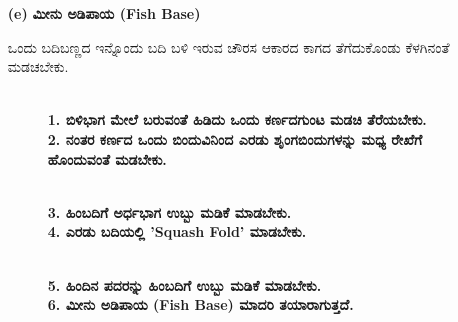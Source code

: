 \begin{enumerate}
\item[{\bf (e)}] \textbf{ಮೀನು ಅಡಿಪಾಯ (Fish Base)}

ಒಂದು ಬದಿಬಣ್ಣದ ಇನ್ನೊಂದು ಬದಿ ಬಳಿ ಇರುವ ಚೌರಸ ಆಕಾರದ ಕಾಗದ ತೆಗೆದುಕೊಂಡು ಕೆಳಗಿನಂತೆ ಮಡಚಬೇಕು.
\begin{figure}[H]
\\
\textbf{1. ಬಿಳಿಭಾಗ ಮೇಲೆ ಬರುವಂತೆ ಹಿಡಿದು ಒಂದು ಕರ್ಣದಗುಂಟ ಮಡಚಿ ತೆರೆಯಬೇಕು.}\\
\textbf{2. ನಂತರ ಕರ್ಣದ ಒಂದು ಬಿಂದುವಿನಿಂದ ಎರಡು ಶೃಂಗಬಿಂದುಗಳನ್ನು ಮಧ್ಯ ರೇಖೆಗೆ ಹೊಂದುವಂತೆ ಮಡಬೇಕು.}
\end{figure}
\begin{figure}[H]
\\
\textbf{3. ಹಿಂಬದಿಗೆ ಅರ್ಧಭಾಗ ಉಬ್ಬು ಮಡಿಕೆ ಮಾಡಬೇಕು.}\\
\textbf{4. ಎರಡು ಬದಿಯಲ್ಲಿ 'Squash Fold' ಮಾಡಬೇಕು.}
\end{figure}
\begin{figure}[H]
\\
\textbf{5. ಹಿಂದಿನ ಪದರನ್ನು ಹಿಂಬದಿಗೆ ಉಬ್ಬು ಮಡಿಕೆ ಮಾಡಬೇಕು. }\\
\textbf{6. ಮೀನು ಅಡಿಪಾಯ (Fish Base) ಮಾದರಿ ತಯಾರಾಗುತ್ತದೆ.}
\end{figure}


\end{enumerate}
